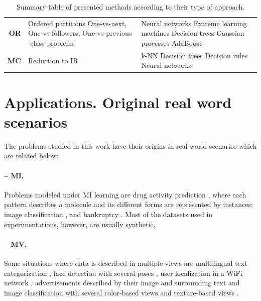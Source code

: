 \documentclass[
	fontsize=11pt, %
	twoside=false, %
	open=any, %
	secnumdepth=1, %
]{kaobook}
\begin{document}
\begin{table}[ht]
\begin{tabular}{r p{} p{}}
\textbf{OR} & 
Ordered partitions \cite{ord-simple} \newline One-vs-next, One-vs-followers, One-vs-previous \cite{ord-survey} \newline 3-class problems \cite{ord-survey}& 
Neural networks \cite{or-nn,or-nn2} \newline Extreme learning machines \cite{or-elm,or-elm2} \newline Decision trees \cite{or-knn-dt} \newline Gaussian processes \cite{or-gp} \newline AdaBoost \cite{or-ada} \\
\textbf{MC} & 
Reduction to IR \cite{monotonicity}& 
k-NN \cite{mc-knn}\newline Decision trees \cite{mc-trees}\newline Decision rules \cite{mc-rules,mc-rules2}\newline Neural networks \cite{mc-monnets}\\
\toprule
\end{tabular}
\caption{\label{tbl.methods}Summary table of presented methods according to their type of approach.}
\end{table}


\section{Applications. Original real word scenarios}
\label{sec:applications}

The problems studied in this work have their origins in real-world scenarios which are related below:

\paragraph{-- MI.} Problems modeled under MI learning are drug activity prediction \cite{mi-apr}, where each pattern describes a molecule and its different forms are represented by instances; image classification \cite{mic-taxonomy}, and bankruptcy \cite{ami-bank}. Most of the datasets used in experimentations, however, are usually synthetic.

\paragraph{-- MV.} Some situations where data is described in multiple views are multilingual text categorization \cite{amv-multilingual}, face detection with several poses \cite{amv-face}, user localization in a WiFi network \cite{amv-wifi}, advertisements described by their image and surrounding text \cite{amv-ads-webkb} and image classification with several color-based views and texture-based views \cite{amv-corel}.
\end{document}
